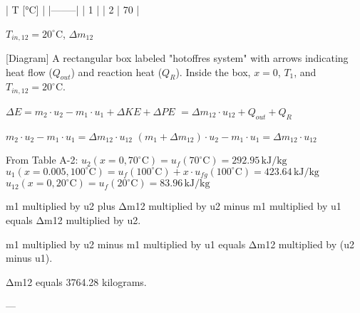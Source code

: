 | T [°C] |  
|--------|  
| 1      |  
| 2      | 70 |  

\( T_{in,12} = 20^\circ \text{C} \), \( \Delta m_{12} \)  

[Diagram]  
A rectangular box labeled "hotoffres system" with arrows indicating heat flow (\( Q_{out} \)) and reaction heat (\( Q_R \)). Inside the box, \( x = 0 \), \( T_1 \), and \( T_{in,12} = 20^\circ \text{C} \).  

\( \Delta E = m_2 \cdot u_2 - m_1 \cdot u_1 + \Delta KE + \Delta PE \)  
\( = \Delta m_{12} \cdot u_{12} + Q_{out} + Q_R \)  

\( m_2 \cdot u_2 - m_1 \cdot u_1 = \Delta m_{12} \cdot u_{12} \)  
\( (m_1 + \Delta m_{12}) \cdot u_2 - m_1 \cdot u_1 = \Delta m_{12} \cdot u_{12} \)  

From Table A-2:  
\( u_2 (x = 0, 70^\circ \text{C}) = u_f(70^\circ \text{C}) = 292.95 \, \text{kJ/kg} \)  
\( u_1 (x = 0.005, 100^\circ \text{C}) = u_f(100^\circ \text{C}) + x \cdot u_{fg}(100^\circ \text{C}) = 423.64 \, \text{kJ/kg} \)  
\( u_{12} (x = 0, 20^\circ \text{C}) = u_f(20^\circ \text{C}) = 83.96 \, \text{kJ/kg} \)

m1 multiplied by u2 plus Δm12 multiplied by u2 minus m1 multiplied by u1 equals Δm12 multiplied by u2.  

m1 multiplied by u2 minus m1 multiplied by u1 equals Δm12 multiplied by (u2 minus u1).  

Δm12 equals 3764.28 kilograms.  

---